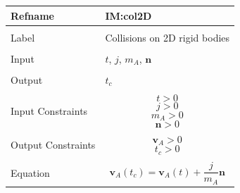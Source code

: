 \documentclass[12pt]{article}
\begin{document}
\noindent \begin{minipage}{\textwidth}
          \begin{tabular}{>{\raggedright}p{}>{\raggedright\arraybackslash}p{}}
          \toprule \textbf{Refname} & \textbf{IM:col2D}
          \label{IM:col2D}
          \\ \midrule \\
          Label & Collisions on 2D rigid bodies
          \\ \midrule \\
          Input & $t$, $j$, ${m_{A}}$, $\mathbf{n}$
          \\ \midrule \\
          Output & ${t_{c}}$
          \\ \midrule \\
          Input Constraints & \begin{displaymath}
                              t>0
                              \end{displaymath}
                              \begin{displaymath}
                              j>0
                              \end{displaymath}
                              \begin{displaymath}
                              {m_{A}}>0
                              \end{displaymath}
                              \begin{displaymath}
                              \mathbf{n}>0
                              \end{displaymath}
          \\ \midrule \\
          Output Constraints & \begin{displaymath}
                               {\mathbf{v}_{A}}>0
                               \end{displaymath}
                               \begin{displaymath}
                               {t_{c}}>0
                               \end{displaymath}
          \\ \midrule \\
          Equation & \begin{displaymath}
                     {\mathbf{v}_{A}}\left({t_{c}}\right)={\mathbf{v}_{A}}\left(t\right)+\frac{j}{{m_{A}}} \mathbf{n}

\end{displaymath}
\end{tabular}
\end{minipage}
\end{document}
